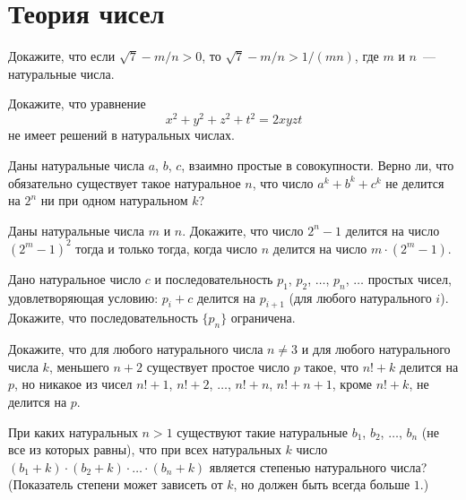 

\section*{Теория чисел}


\begin{problems}

\item
Докажите, что если $\sqrt{7} - m / n > 0$,
то $\sqrt{7} - m / n > 1 / (mn)$,
где $m$ и $n$~--- натуральные числа.

\item
Докажите, что уравнение
\[
    x^2 + y^2 + z^2 + t^2 = 2 x y z t
\]
не имеет решений в натуральных числах.

\item
Даны натуральные числа $a$, $b$, $c$, взаимно простые в совокупности.
Верно ли, что обязательно существует такое натуральное $n$, что число
$a^k + b^k + c^k$ не делится на $2^n$ ни при одном натуральном $k$?

\item
Даны натуральные числа $m$ и $n$.
Докажите, что число $2^n - 1$ делится на число $(2^m - 1)^2$ тогда и только
тогда, когда число $n$ делится на число $m \cdot (2^m - 1)$.

\item
Дано натуральное число $c$ и последовательность
$p_1$, $p_2$, $\ldots$, $p_n$, $\ldots$ простых чисел, удовлетворяющая условию:
$p_i + c$ делится на $p_{i+1}$ (для любого натурального $i$).
Докажите, что последовательность $\{p_n\}$ ограничена.

\item
Докажите, что для любого натурального числа $n \neq 3$ и для любого
натурального числа $k$, меньшего $n + 2$ существует простое число $p$ такое,
что $n! + k$ делится на $p$, но никакое из чисел
$n! + 1$, $n! + 2$, $\ldots$, $n! + n$, $n! + n + 1$,
кроме $n! + k$, не делится на $p$.

\item
При каких натуральных $n > 1$ существуют такие натуральные
$b_1$, $b_2$, $\ldots$, $b_n$ (не все из которых равны), что при всех
натуральных $k$ число
$(b_1 + k) \cdot (b_2 + k) \cdot \ldots \cdot (b_n + k)$
является степенью натурального числа?
(Показатель степени может зависеть от $k$, но должен быть всегда больше $1$.)



\end{problems}


